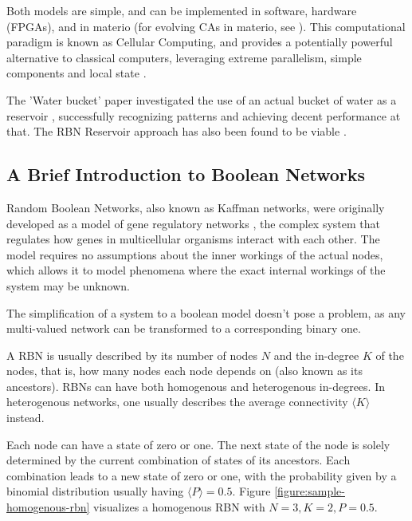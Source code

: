 Both models are simple, and can be implemented in software,
hardware (FPGAs), and in materio \cite{miller2002evolution}
(for evolving CAs in materio, see \cite{farstad2015evolving}).
This computational paradigm is known as Cellular Computing,
and provides a potentially powerful alternative to classical computers,
leveraging extreme parallelism, simple components and local state \cite{sipper1999emergence}.

The 'Water bucket' paper investigated the use of an actual bucket of water as a reservoir \cite{fernando2003pattern},
successfully recognizing patterns and achieving decent performance at that.
The RBN Reservoir approach has also been found to be viable \cite{rbn-reservoir} .

\subsection{A Brief Introduction to Boolean Networks}
\label{section:rbns}

Random Boolean Networks, also known as Kaffman networks,
were originally developed as a model of gene regulatory networks \cite{kauffman1969metabolic},
the complex system that regulates how genes in multicellular organisms interact with each other.
The model requires no assumptions about the inner workings of the actual nodes,
which allows it to model phenomena where the exact internal workings of the system may be unknown.

The simplification of a system to a boolean model doesn't pose a problem,
as any multi-valued network can be transformed to a corresponding binary one.

A RBN is usually described by its number of nodes $N$ and the in-degree $K$ of the nodes,
that is, how many nodes each node depends on (also known as its ancestors).
RBNs can have both homogenous and heterogenous in-degrees.
In heterogenous networks, one usually describes the average connectivity $\langle K \rangle$ instead.

Each node can have a state of zero or one.
The next state of the node is solely determined by the current combination of states of its ancestors.
Each combination leads to a new state of zero or one,
with the probability given by a binomial distribution usually having $\langle P \rangle = 0.5$.
Figure \ref{figure:sample-homogenous-rbn} visualizes a homogenous RBN with $N=3, K=2, P=0.5$.

